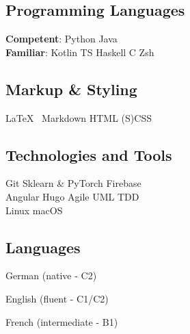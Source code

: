 \documentclass[]{jonas-cv}
\begin{document}
\lastupdated


%
%

\begin{minipage}[t]{0.33\textwidth} 


\tinysectionsep
\vspace{0.3mm}

\subsection{Programming Languages}
\textbf{Competent}: Python \smalltextbullet{} Java\\
\textbf{Familiar}: Kotlin \smalltextbullet{} TS \smalltextbullet{} Haskell \smalltextbullet{} C \smalltextbullet{} Zsh
\sectionsep

\subsection{Markup \& Styling}
\LaTeX \ \smalltextbullet{} Markdown \smalltextbullet{} HTML \smalltextbullet{} (S)CSS
\sectionsep

\subsection{Technologies and Tools}
Git \smalltextbullet{} Sklearn \& PyTorch \smalltextbullet{} Firebase \smalltextbullet{}\\
Angular \smalltextbullet{} Hugo \smalltextbullet{} Agile \smalltextbullet{} UML \smalltextbullet{} TDD \smalltextbullet{}\\
Linux \smalltextbullet{} macOS
\sectionsep

\subsection{Languages}
\tinysectionsep
\tinysectionsep

\begin{tightemize}
    \item[\color{headings}\angleRightSymbol] German (native - C2)
    \item[\color{headings}\angleRightSymbol] English (fluent - C1/C2)
    \item[\color{headings}\angleRightSymbol] French (intermediate - B1)
\end{tightemize}
\sectionsep 


\end{minipage}
\end{document}

